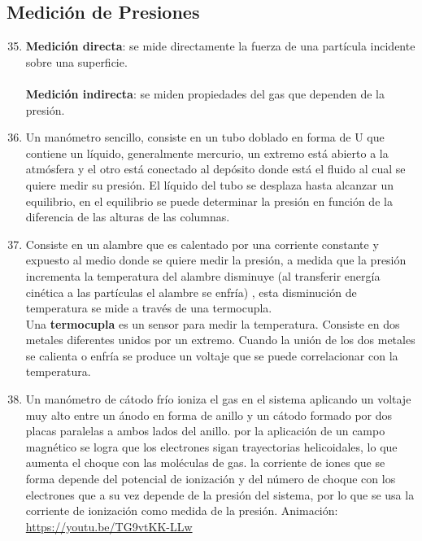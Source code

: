 \subsection{Medición de Presiones}

\begin{enumerate}
    \setcounter{enumi}{34}
    \item %
    \textbf{Medición directa}: se mide directamente la fuerza de una partícula incidente sobre una superficie. \\ \\
    \textbf{Medición indirecta}: se miden propiedades del gas que dependen de la presión. 
    \item %
    Un manómetro sencillo, consiste en un tubo doblado en forma de U que contiene un líquido, generalmente mercurio, un extremo está abierto a la atmósfera y el otro está conectado al depósito donde está el fluido al cual se quiere medir su presión. El líquido del tubo se desplaza hasta alcanzar un equilibrio, en el equilibrio se puede determinar la presión en función de la diferencia de las alturas de las columnas.
    \item %
    Consiste en un alambre que es calentado por una corriente constante y expuesto al medio donde se quiere medir la presión, a medida que la presión incrementa la temperatura del alambre disminuye (al transferir energía cinética a las partículas el alambre se enfría) , esta disminución de temperatura se mide a través de una termocupla.
    \\
    Una \textbf{termocupla} es un sensor para medir la temperatura. Consiste en dos metales diferentes unidos por un extremo. Cuando la unión de los dos metales se calienta o enfría se produce un voltaje que se puede correlacionar con la temperatura.
    \item %
    Un manómetro de cátodo frío ioniza el gas en el sistema aplicando un voltaje muy alto entre un ánodo en forma de anillo y un cátodo formado por dos placas paralelas a ambos lados del anillo. por la aplicación de un campo magnético se logra que los electrones sigan trayectorias helicoidales, lo que aumenta el choque con las moléculas de gas. la corriente de iones que se forma depende del potencial de ionización y del número de choque con los electrones que a su vez depende de la presión del sistema, por lo que se usa la corriente de ionización como medida de la presión.
    Animación: \url{https://youtu.be/TG9vtKK-LLw}
\end{enumerate}


